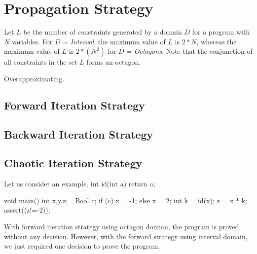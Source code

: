 \section{Propagation Strategy}\label{deduction}
Let $L$ be the number of constraints generated by a domain $D$
for a program with $N$ variables. For $D$ = {\em Interval}, the 
maximum value of $L$ is $2*N$, whereas the maximum value of $L$ is 
$2*(N^2)$ for $D$ = {\em Octagons}. Note that the conjunction of all 
constraints in the set $L$ forms an octagon.

Overapproximating.
\subsection{Forward Iteration Strategy}

\subsection{Backward Iteration Strategy}

\subsection{Chaotic Iteration Strategy}  

Let us consider an example. 
int id(int a)
{
  return a;
}

void main() {
 int x,y,z;
 _Bool c;
 if (c)
   x = -1;
 else
   x = 2;
 int k = id(x);
 z = x * k;
 assert((z!=-2));
}

With forward iteration strategy using octagon domian, the program 
is proved without any decision. However, with the forward strategy
using interval domain, we just required one decision to prove the program. 
